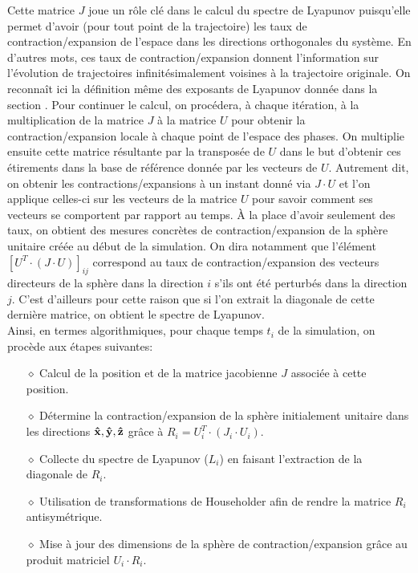     Cette matrice $J$ joue un rôle clé dans le calcul du spectre de Lyapunov
    puisqu'elle permet d'avoir (pour tout point de la trajectoire) les taux de
    contraction/expansion de l'espace dans les directions orthogonales du
    système. En d'autres mots, ces taux de contraction/expansion donnent
    l'information sur l'évolution de trajectoires infinitésimalement voisines
    à la trajectoire originale. On reconnaît ici la définition même des
    exposants de Lyapunov donnée dans la section .
    Pour continuer le calcul, on procédera, à chaque itération, à la
    multiplication de la matrice $J$ à la matrice $U$ pour obtenir la
    contraction/expansion locale à chaque point de l'espace des phases. On
    multiplie ensuite cette matrice résultante par la transposée de $U$ dans
    le but d'obtenir ces étirements dans la base de référence donnée par les
    vecteurs de $U$. Autrement dit, on obtenir les contractions/expansions à un
    instant donné via $J\cdot U$ et l'on applique celles-ci sur les vecteurs de
    la matrice $U$ pour savoir comment ses vecteurs se comportent par rapport
    au temps. À la place d'avoir seulement des taux, on obtient des mesures
    concrètes de contraction/expansion de la sphère unitaire créée au début de
    la simulation. On dira notamment que l'élément $[U^T\cdot(J\cdot U)]_{ij}$
    correspond au taux de contraction/expansion des vecteurs directeurs de la
    sphère dans la direction $i$ s'ils ont été perturbés dans la direction $j$.
    C'est d'ailleurs pour cette raison que si l'on extrait la diagonale de
    cette dernière matrice, on obtient le spectre de Lyapunov. \\

    Ainsi, en termes algorithmiques, pour chaque temps $t_i$ de la simulation,
    on procède aux étapes suivantes: \\
    \begin{itemize}
        \item[$\diamond$] Calcul de la position et de la matrice jacobienne
            $J$ associée à cette position. \\
        \item[$\diamond$] Détermine la contraction/expansion de la sphère
            initialement unitaire dans les directions $\mathbf{\hat{x}}, \mathbf{\hat{y}},
            \mathbf{\hat{z}}$ grâce à $R_i = U_i^T\cdot(J_i\cdot U_i)$. \\
        \item[$\diamond$] Collecte du spectre de Lyapunov ($L_i$) en faisant
            l'extraction de la diagonale de $R_i$. \\
        \item[$\diamond$] Utilisation de transformations de Householder afin
            de rendre la matrice $R_i$ antisymétrique. \\
        \item[$\diamond$] Mise à jour des dimensions de la sphère de
            contraction/expansion grâce au produit matriciel $U_i\cdot R_i$. \\
    \end{itemize}

